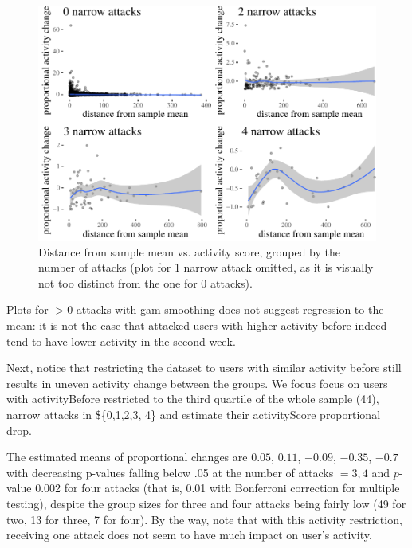 \documentclass[a4paper,fleqn]{cas-dc}
\begin{document}
\begin{figure}

\begin{center}
\includegraphics[width=1\linewidth]{images/unnamed-chunk-60-1} \end{center}
\caption{Distance from sample mean vs. activity score, grouped by the number of attacks (plot for 1 narrow attack omitted, as it is visually not too distinct from the one for 0 attacks).}
\label{fig:regression2}
\end{figure}

Plots for \(>0\) attacks with gam smoothing does not suggest regression
to the mean: it is not the case that attacked users with higher activity
before indeed tend to have lower activity in the second week.

Next, notice that restricting the dataset to users with similar activity
before still results in uneven activity change between the groups. We
focus focus on users with \textsf{activityBefore} restricted to the
third quartile of the whole sample (44), narrow attacks in \$\{0,1,2,3,
4\} and estimate their \textsf{activityScore} proportional drop.

\normalsize  The estimated means of proportional changes are
$0.05$, $0.11$, $-0.09$, $-0.35$, $-0.7$ with decreasing p-values falling below
.05 at the number of attacks \(=3, 4\) and \(p\)-value 0.002 for four
attacks (that is, 0.01 with Bonferroni correction for multiple testing),
despite the group sizes for three and four attacks being fairly low (49
for two, 13 for three, 7 for four). By the way, note that with this
activity restriction, receiving one attack does not seem to have much
impact on user's activity.
\end{document}
